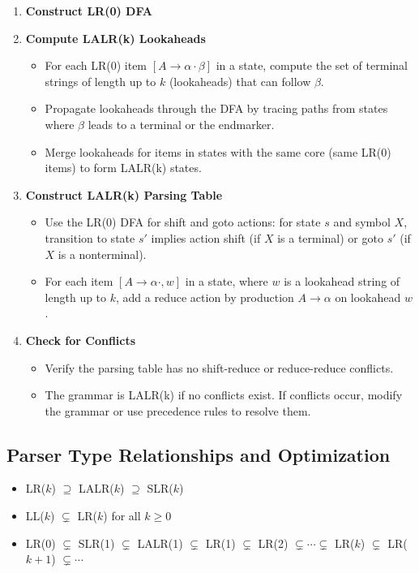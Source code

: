 \begin{enumerate}
    \item \textbf{Construct LR(0) DFA}

    \item \textbf{Compute LALR(k) Lookaheads}
    \begin{itemize}
        \item For each LR(0) item $[A \to \alpha \cdot \beta]$ in a state, compute the set of terminal strings of length up to $k$ (lookaheads) that can follow $\beta$.
        \item Propagate lookaheads through the DFA by tracing paths from states where $\beta$ leads to a terminal or the endmarker.
        \item Merge lookaheads for items in states with the same core (same LR(0) items) to form LALR(k) states.
    \end{itemize}

    \item \textbf{Construct LALR(k) Parsing Table}
    \begin{itemize}
        \item Use the LR(0) DFA for shift and goto actions: for state $s$ and symbol $X$, transition to state $s'$ implies action shift (if $X$ is a terminal) or goto $s'$ (if $X$ is a nonterminal).
        \item For each item $[A \to \alpha \cdot, w]$ in a state, where $w$ is a lookahead string of length up to $k$, add a reduce action by production $A \to \alpha$ on lookahead $w$.
    \end{itemize}

    \item \textbf{Check for Conflicts}
    \begin{itemize}
        \item Verify the parsing table has no shift-reduce or reduce-reduce conflicts.
        \item The grammar is LALR(k) if no conflicts exist. If conflicts occur, modify the grammar or use precedence rules to resolve them.
    \end{itemize}
\end{enumerate}


\subsection{Parser Type Relationships and Optimization}

\begin{itemize}
    \item LR($k$) $\supseteq$ LALR($k$) $\supseteq$ SLR($k$)
    \item LL($k$) $\subsetneq$ LR($k$)  for all $k \geq 0$
    \item LR(0) $\subsetneq$ SLR(1) $\subsetneq$ LALR(1) $\subsetneq$ LR(1) $\subsetneq$ LR(2) $\subsetneq \cdots \subsetneq$ LR($k$) $\subsetneq$ LR($k + 1$) $\subsetneq \cdots$
\end{itemize}
